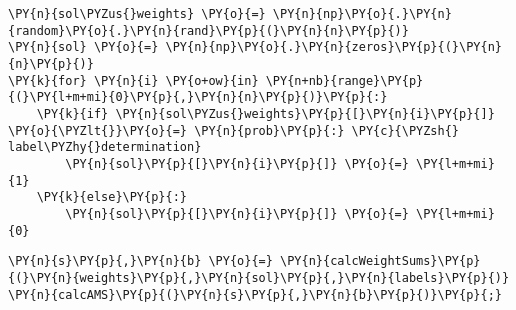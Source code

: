 {\par%
\vspace{-1\baselineskip}%
}%
\begin{notebookcell}[]%
\begin{addmargin}[\cellleftmargin]{0em}%
{\smaller%
\par%
%
\vspace{-1\smallerfontscale}%
\begin{Verbatim}[commandchars=\\\{\}]
\PY{n}{sol\PYZus{}weights} \PY{o}{=} \PY{n}{np}\PY{o}{.}\PY{n}{random}\PY{o}{.}\PY{n}{rand}\PY{p}{(}\PY{n}{n}\PY{p}{)}
\PY{n}{sol} \PY{o}{=} \PY{n}{np}\PY{o}{.}\PY{n}{zeros}\PY{p}{(}\PY{n}{n}\PY{p}{)}
\PY{k}{for} \PY{n}{i} \PY{o+ow}{in} \PY{n+nb}{range}\PY{p}{(}\PY{l+m+mi}{0}\PY{p}{,}\PY{n}{n}\PY{p}{)}\PY{p}{:}
    \PY{k}{if} \PY{n}{sol\PYZus{}weights}\PY{p}{[}\PY{n}{i}\PY{p}{]} \PY{o}{\PYZlt{}}\PY{o}{=} \PY{n}{prob}\PY{p}{:} \PY{c}{\PYZsh{} label\PYZhy{}determination}
        \PY{n}{sol}\PY{p}{[}\PY{n}{i}\PY{p}{]} \PY{o}{=} \PY{l+m+mi}{1}
    \PY{k}{else}\PY{p}{:}
        \PY{n}{sol}\PY{p}{[}\PY{n}{i}\PY{p}{]} \PY{o}{=} \PY{l+m+mi}{0}
\end{Verbatim}
%
\par%
\vspace{-1\smallerfontscale}}%
\end{addmargin}
\end{notebookcell}



{\par%
\vspace{-1\baselineskip}%
}%
\begin{notebookcell}[]%
\begin{addmargin}[\cellleftmargin]{0em}%
{\smaller%
\par%
%
\vspace{-1\smallerfontscale}%
\begin{Verbatim}[commandchars=\\\{\}]
\PY{n}{s}\PY{p}{,}\PY{n}{b} \PY{o}{=} \PY{n}{calcWeightSums}\PY{p}{(}\PY{n}{weights}\PY{p}{,}\PY{n}{sol}\PY{p}{,}\PY{n}{labels}\PY{p}{)}
\PY{n}{calcAMS}\PY{p}{(}\PY{n}{s}\PY{p}{,}\PY{n}{b}\PY{p}{)}\PY{p}{;}
\end{Verbatim}
%
\par%
\vspace{-1\smallerfontscale}}%
\end{addmargin}
\end{notebookcell}
